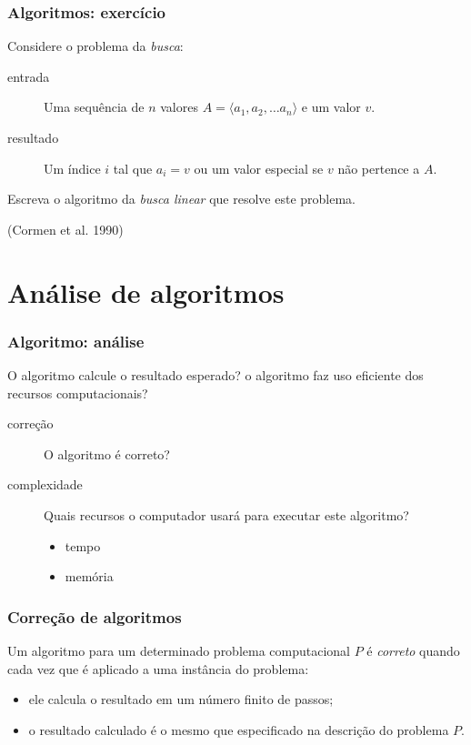 \documentclass{beamer}
\begin{document}
\begin{frame}

  \frametitle{Algoritmos: exercício}

Considere o problema da \emph{busca}:

\begin{description}
\item[entrada] Uma sequência de $n$ valores $A = \langle a_1, a_2, \ldots a_n \rangle$
e um valor $v$.
\item[resultado] Um índice $i$ tal que $a_i = v$ ou um valor especial  se $v$ não pertence a $A$.
\end{description}

Escreva o algoritmo da \emph{busca linear} que resolve este problema.

(Cormen et al. 1990)

\end{frame}

\section{Análise de algoritmos}

\begin{frame}

  \frametitle{Algoritmo: análise}

  O algoritmo calcule o resultado esperado? o algoritmo faz uso eficiente dos
  recursos computacionais?
  \begin{description}
  \item[correção] O algoritmo é correto? 
  \item[complexidade] Quais recursos o computador usará para executar este
    algoritmo?
    \begin{itemize}
    \item tempo
    \item memória
    \end{itemize}
  \end{description}

\end{frame}

\begin{frame}

  \frametitle{Correção de algoritmos}

  Um algoritmo para um determinado problema computacional $P$ é \emph{correto}
  quando cada vez que é aplicado a uma instância do problema:
  \pause
  \begin{itemize}
    \item ele calcula o resultado em um número finito de passos;
    \item o resultado calculado é o mesmo que especificado na descrição do
      problema $P$.
  \end{itemize}

\end{frame}
\end{document}
